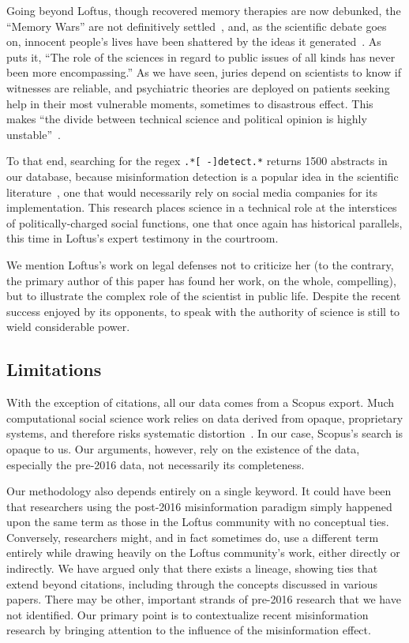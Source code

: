 \documentclass[          
 pre,
 twocolumn,
 twoside,
 superscriptaddress,
 amsmath,
 amssymb,                
 apsf
]{revtex4-2}
\begin{document}
Going beyond Loftus, though recovered memory therapies are now debunked, the ``Memory Wars'' are not definitively settled~\cite{otgaarReturnRepressedPersistent2019}, and, as the scientific debate goes on, innocent people's lives have been shattered by the ideas it generated~\cite{shewan_conviction_2015}. As \citet{porter_how_2009} puts it, ``The role of the sciences in regard to public issues of all kinds has never been more encompassing.'' As we have seen, juries depend on scientists to know if witnesses are reliable, and psychiatric theories are deployed on patients seeking help in their most vulnerable moments, sometimes to disastrous effect. This makes ``the divide between technical science and political opinion is highly unstable''~\cite{porter_how_2009}.

To that end, searching for the regex \texttt{.*[ -]detect.*} returns 1500 abstracts in our database, because misinformation detection is a popular idea in the scientific literature~\cite{broda_misinformation_2024}, one that would necessarily rely on social media companies for its implementation. This research places science in a technical role at the interstices of politically-charged social functions, one that once again has historical parallels, this time in Loftus's expert testimony in the courtroom. 

We mention Loftus's work on legal defenses not to criticize her (to the contrary, the primary author of this paper has found her work, on the whole, compelling), but to illustrate the complex role of the scientist in public life. Despite the recent success enjoyed by its opponents, to speak with the authority of science is still to wield considerable power. 

\subsection{Limitations}
\label{limitations}

With the exception of citations, all our data comes from a Scopus export. Much computational social science work relies on data derived from opaque, proprietary systems, and therefore risks systematic distortion~\cite{poudelCuratedRealitiesIntersection2025}. In our case, Scopus's search is opaque to us. Our arguments, however, rely on the existence of the data, especially the pre-2016 data, not necessarily its completeness. 

Our methodology also depends entirely on a single keyword. It could have been that researchers using the post-2016 misinformation paradigm simply happened upon the same term as those in the Loftus community with no conceptual ties. Conversely, researchers might, and in fact sometimes do, use a different term entirely while drawing heavily on the Loftus community's work, either directly or indirectly. We have argued only that there exists a lineage, showing ties that extend beyond citations, including through the concepts discussed in various papers. There may be other, important strands of pre-2016 research that we have not identified. Our primary point is to contextualize recent misinformation research by bringing attention to the influence of the misinformation effect.
\end{document}
